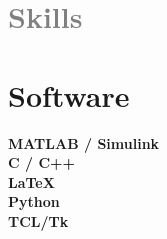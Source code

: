 \documentclass[]{friggeri-cv}
\begin{document}
\begin{aside}
\section{\textcolor{gray}{\LARGE Skills}}
  \section{Software}
    \textbf{MATLAB / Simulink}\\%
    \textbf{C / C++}\\%
    \textbf{LaTeX}\\%
    \textbf{Python}\\%
    \textbf{TCL/Tk}\\%

\end{aside}
\end{document}
